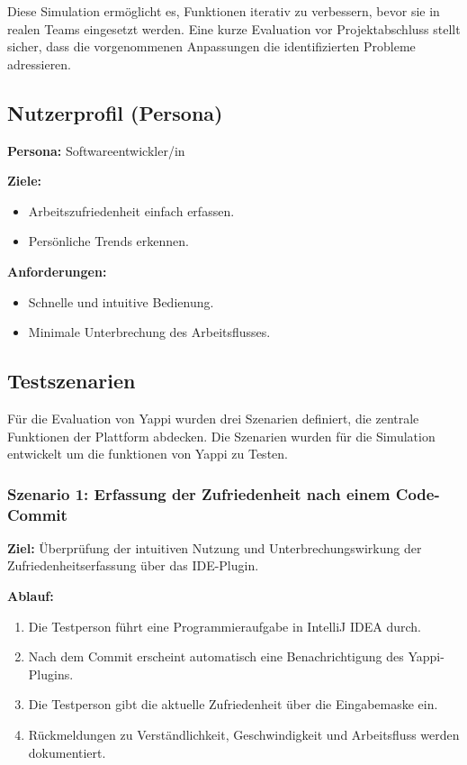\documentclass[12pt,a4paper]{report}
\begin{document}
Diese Simulation ermöglicht es, Funktionen iterativ zu verbessern, bevor sie in realen Teams eingesetzt werden. Eine
kurze Evaluation vor Projektabschluss stellt sicher, dass die vorgenommenen Anpassungen die identifizierten Probleme adressieren.

    \subsection{Nutzerprofil (Persona)}

    \textbf{Persona:} Softwareentwickler/in

    \textbf{Ziele:}
    \begin{itemize}
        \item Arbeitszufriedenheit einfach erfassen.
        \item Persönliche Trends erkennen.
    \end{itemize}

    \textbf{Anforderungen:}
    \begin{itemize}
        \item Schnelle und intuitive Bedienung.
        \item Minimale Unterbrechung des Arbeitsflusses.
    \end{itemize}

    \subsection{Testszenarien}

    Für die Evaluation von Yappi wurden drei Szenarien definiert, die zentrale Funktionen der Plattform abdecken.
    Die Szenarien wurden für die Simulation entwickelt um die funktionen von Yappi zu Testen.

    \subsubsection{Szenario 1: Erfassung der Zufriedenheit nach einem Code-Commit}
    \textbf{Ziel:} Überprüfung der intuitiven Nutzung und Unterbrechungswirkung der Zufriedenheitserfassung über das IDE-Plugin.

    \textbf{Ablauf:}
    \begin{enumerate}
        \item Die Testperson führt eine Programmieraufgabe in IntelliJ IDEA durch.
        \item Nach dem Commit erscheint automatisch eine Benachrichtigung des Yappi-Plugins.
        \item Die Testperson gibt die aktuelle Zufriedenheit über die Eingabemaske ein.
        \item Rückmeldungen zu Verständlichkeit, Geschwindigkeit und Arbeitsfluss werden dokumentiert.
    \end{enumerate}
\end{document}
